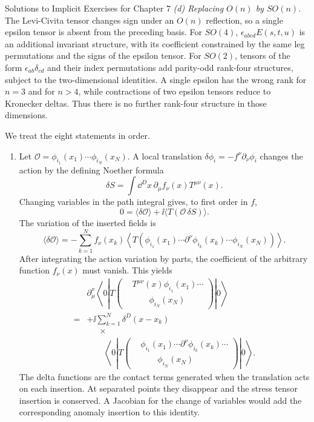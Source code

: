 \begin{bankssolutions}{Solutions to Implicit Exercises for Chapter 7}
\textit{(d) Replacing $O(n)$ by $SO(n)$.}
The Levi-Civita tensor changes sign under an $O(n)$ reflection, so a single
epsilon tensor is absent from the preceding basis.  For $SO(4)$,
$\epsilon_{abcd}E(s,t,u)$ is an additional invariant structure, with its
coefficient constrained by the same leg permutations and the signs of the
epsilon tensor.  For $SO(2)$, tensors of the form
$\epsilon_{ab}\delta_{cd}$ and their index permutations add parity-odd
rank-four structures, subject to the two-dimensional identities.  A single
epsilon has the wrong rank for $n=3$ and for $n>4$, while contractions of two
epsilon tensors reduce to Kronecker deltas.  Thus there is no further
rank-four structure in those dimensions.

We treat the eight statements in order.

\begin{enumerate}[label=(\alph*)]
\item Let
$\mathcal O=\phi_{i_1}(x_1)\cdots\phi_{i_N}(x_N)$.  A local translation
$\delta\phi_i=-f^\nu\partial_\nu\phi_i$ changes the action by the defining
Noether formula
\[
 \delta S=\int\dd^D x\,\partial_\mu f_\nu(x)T^{\mu\nu}(x).
\]
Changing variables in the path integral gives, to first order in $f$,
\[
 0=\langle\delta\mathcal O\rangle
 +\ii\langle T(\mathcal O\,\delta S)\rangle.
\]
The variation of the inserted fields is
\[
 \langle\delta\mathcal O\rangle
 =-\sum_{k=1}^N f_\nu(x_k)
 \left\langle T\left(
 \phi_{i_1}(x_1)\cdots
 \partial^\nu\phi_{i_k}(x_k)\cdots
 \phi_{i_N}(x_N)\right)\right\rangle.
\]
After integrating the action variation by parts, the coefficient of the
arbitrary function $f_\nu(x)$ must vanish.  This yields
\begin{align*}
 &\partial_\mu^x
 \left\langle0\left|T\left(
 \begin{aligned}
  &T^{\mu\nu}(x)\phi_{i_1}(x_1)\cdots\\[-2pt]
  &{}\qquad\phi_{i_N}(x_N)
 \end{aligned}
 \right)\right|0\right\rangle\\[-2pt]
 ={}&+\ii\sum_{k=1}^N\delta^D(x-x_k)\\
 &\mathrel{\phantom{=}}\times\\[-2pt]
 &\qquad
 \left\langle0\left|T\left(
 \begin{aligned}
  &\phi_{i_1}(x_1)\cdots
   \partial^\nu\phi_{i_k}(x_k)\cdots\\[-2pt]
  &{}\qquad\phi_{i_N}(x_N)
 \end{aligned}
 \right)\right|0\right\rangle.
\end{align*}
The delta functions are the contact terms generated when the translation
acts on each insertion.  At separated points they disappear and the stress
tensor insertion is conserved.  A Jacobian for the change of variables would
add the corresponding anomaly insertion to this identity.


\end{enumerate}
\end{bankssolutions}
